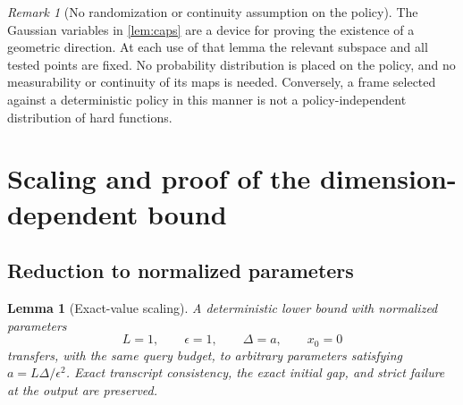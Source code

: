 \documentclass[11pt]{article}
\numberwithin{equation}{section}
\newtheorem{lemma}[lemma]{Lemma}
\theoremstyle{definition}
\theoremstyle{remark}
\newtheorem{remark}[remark]{Remark}
\begin{document}
\begin{remark}[No randomization or continuity assumption on the policy]
The Gaussian variables in \cref{lem:caps} are a device for proving the
existence of a geometric direction. At each use of that lemma the relevant
subspace and all tested points are fixed. No probability distribution is
placed on the policy, and no measurability or continuity of its maps is
needed. Conversely, a frame selected against a deterministic policy in
this manner is not a policy-independent distribution of hard functions.
\end{remark}

\section{Scaling and proof of the dimension-dependent bound}
\label{sec:lower}

\subsection{Reduction to normalized parameters}

\begin{lemma}[Exact-value scaling]
\label{lem:scaling}
A deterministic lower bound with normalized parameters
\[
    L=1,\qquad \epsilon=1,\qquad\Delta=a,\qquad x_0=0
\]
transfers, with the same query budget, to arbitrary parameters satisfying
$a=L\Delta/\epsilon^2$. Exact transcript consistency, the exact initial
gap, and strict failure at the output are preserved.
\end{lemma}
\end{document}
